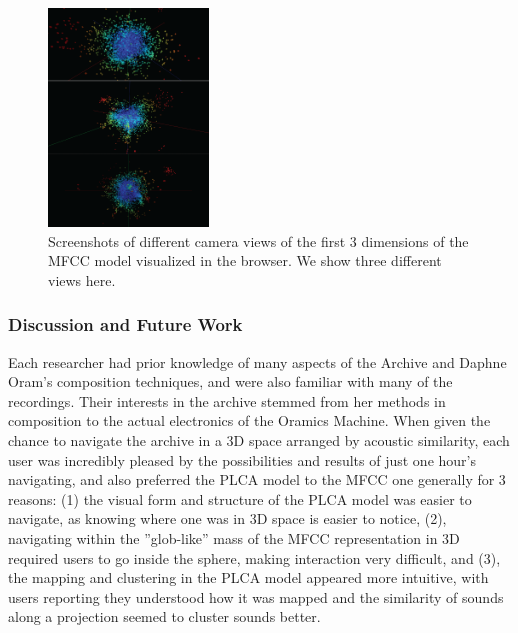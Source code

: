 \documentclass[a4paper,10pt,final]{ThesisStyle}
\begin{document}
\begin{figure}
  \centering
 \includegraphics[width=0.38\textwidth]{images/mfcc-all.png}
  \caption{Screenshots of different camera views of the first 3 dimensions of the MFCC model visualized in the browser.  We show three different views here.}
  \label{fig:mfcc}
\end{figure}



\subsubsection{Discussion and Future Work}\label{discussion}

Each researcher had prior knowledge of many aspects of the Archive and Daphne Oram's composition techniques, and were also familiar with many of the recordings.  Their interests in the archive stemmed from her methods in composition to the actual electronics of the Oramics Machine.  When given the chance to navigate the archive in a 3D space arranged by acoustic similarity, each user was incredibly pleased by the possibilities and results of just one hour's navigating, and also preferred the PLCA model to the MFCC one generally for 3 reasons: (1) the visual form and structure of the PLCA model was easier to navigate, as knowing where one was in 3D space is easier to notice, (2), navigating within the ''glob-like'' mass of the MFCC representation in 3D required users to go inside the sphere, making interaction very difficult, and (3), the mapping and clustering in the PLCA model appeared more intuitive, with users reporting they understood how it was mapped and the similarity of sounds along a projection seemed to cluster sounds better.  
\end{document}
